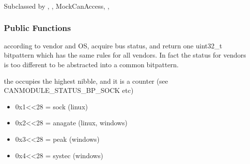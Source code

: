 \documentclass[a4paper,10pt,english]{sphinxmanual}
\begin{document}
\begin{fulllineitems}
\label{\detokenize{canports:_CPPv4N9CanModule10CCanAccessE}}%
\pysigstartmultiline
{}%
\pysigstopmultiline
Subclassed by {\hyperref[\detokenize{vendors/anagate:classAnaCanScan}]{}}, {\hyperref[\detokenize{vendors/systec:classCSockCanScan}]{}}, MockCanAccess, {\hyperref[\detokenize{vendors/peak:classPKCanScan}]{}}, {\hyperref[\detokenize{vendors/systec:classSTCanScan}]{}}
\subsubsection*{Public Functions}

\begin{fulllineitems}
\label{\detokenize{canports:_CPPv4N9CanModule10CCanAccess13getPortStatusEv}}%
\pysigstartmultiline
{}%
\pysigstopmultiline
according to vendor and OS, acquire bus status, and return one uint32\_t bitpattern which has the same rules for all vendors. In fact the status for vendors is too different to be abstracted into a common bitpattern.

the  occupies the highest nibble, and it is a counter (see CANMODULE\_STATUS\_BP\_SOCK etc)\begin{itemize}
\item {} 
0x1\textless{}\textless{}28 = sock (linux)

\item {} 
0x2\textless{}\textless{}28 = anagate (linux, windows)

\item {} 
0x3\textless{}\textless{}28 = peak (windows)

\item {} 
0x4\textless{}\textless{}28 = systec (windows)


\end{itemize}
\end{fulllineitems}
\end{fulllineitems}
\end{document}
